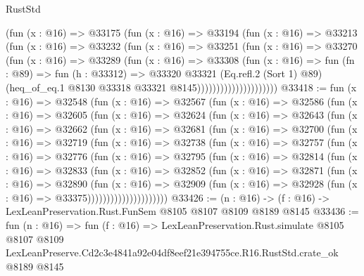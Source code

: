 \begin{lexlean}{RustStd}
\begin{coremodule}
                          (fun (x : @16) =>
                          @33175
                            (fun (x : @16) =>
                            @33194
                              (fun (x : @16) =>
                              @33213
                                (fun (x : @16) =>
                                @33232
                                  (fun (x : @16) =>
                                  @33251
                                    (fun (x : @16) =>
                                    @33270
                                      (fun (x : @16) =>
                                      @33289
                                        (fun (x : @16) =>
                                        @33308
                                          (fun (x : @16) =>
                                          fun (fn : @89) =>
                                          fun (h : @33312) =>
                                          @33320
                                            @33321
                                            (Eq.refl.{2} (Sort 1) @89)
                                            (heq_of_eq.{1}
                                              @8130
                                              @33318
                                              @33321
                                              @8145)))))))))))))))))))))
@33418 := fun (x : @16) =>
  @32548
    (fun (x : @16) =>
    @32567
      (fun (x : @16) =>
      @32586
        (fun (x : @16) =>
        @32605
          (fun (x : @16) =>
          @32624
            (fun (x : @16) =>
            @32643
              (fun (x : @16) =>
              @32662
                (fun (x : @16) =>
                @32681
                  (fun (x : @16) =>
                  @32700
                    (fun (x : @16) =>
                    @32719
                      (fun (x : @16) =>
                      @32738
                        (fun (x : @16) =>
                        @32757
                          (fun (x : @16) =>
                          @32776
                            (fun (x : @16) =>
                            @32795
                              (fun (x : @16) =>
                              @32814
                                (fun (x : @16) =>
                                @32833
                                  (fun (x : @16) =>
                                  @32852
                                    (fun (x : @16) =>
                                    @32871
                                      (fun (x : @16) =>
                                      @32890
                                        (fun (x : @16) =>
                                        @32909
                                          (fun (x : @16) =>
                                          @32928 (fun (x : @16) => @33375)))))))))))))))))))))
@33426 := (n : @16) -> (f : @16) -> LexLeanPreservation.Rust.FunSem @8105 @8107 @8109 @8189 @8145
@33436 := fun (n : @16) =>
  fun (f : @16) =>
  LexLeanPreservation.Rust.simulate
    @8105
    @8107
    @8109
    LexLeanPreserve.Cd2c3e4841a92e04df8eef21e394755ce.R16.RustStd.crate_ok
    @8189
    @8145
\end{coremodule}
\end{lexlean}
